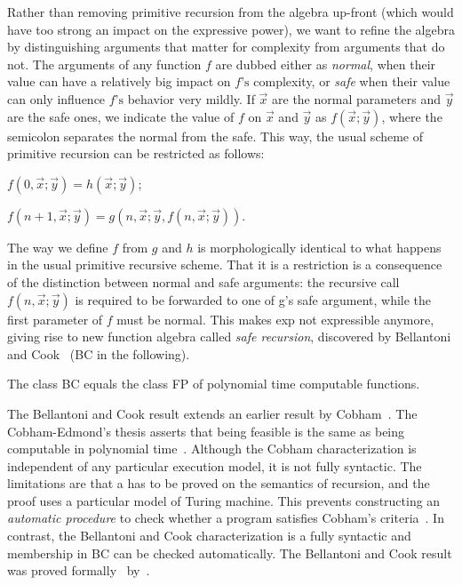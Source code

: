 Rather than removing primitive recursion from the algebra up-front (which would have too strong an impact on the expressive power), %
we want to refine the algebra by distinguishing arguments that matter for complexity from arguments that do not.
The arguments of any function \(f\) are dubbed either as \emph{normal}, when their value can have a relatively big impact on \(f\text{'s}\) complexity, or \emph{safe} when their value can only influence \(f\)\(\text{'s}\) behavior very mildly. %
If \(\vec{x}\) are the normal parameters and \(\vec{y}\) are the safe ones,
we indicate the value of \(f\) on \(\vec{x}\) and \(\vec{y}\) as \(f(\vec{x};\vec{y})\),
where the semicolon separates the normal from the safe.
This way, the usual scheme of primitive recursion can be restricted as follows:

\begin{center}
    \(f (0, \vec{x};\vec{y}) = h (\vec{x};\vec{y})\);

    \(f (n + 1,\vec{x};{ }\vec{y}) = g (n, \vec{x}; \vec{y}, f(n,\vec{x}; \vec{y})) \).
\end{center}

\noindent The way we define \(f\) from \(g\) and \(h\) is morphologically identical to what happens in the usual primitive recursive scheme.
That it is a restriction is a consequence of the distinction between normal and safe arguments: the recursive call \(f(n,\vec{x}; \vec{y})\) is required to be forwarded to one of g's safe argument, while the first parameter of \(f\) must be normal.
This makes exp not expressible anymore, giving rise to new function algebra called \emph{safe recursion}, discovered by Bellantoni and Cook~\cite{bellantoni1992} (BC in the following).

\begin{theorem}
The class BC equals the class FP of polynomial time computable functions.
\end{theorem}

The Bellantoni and Cook result extends an earlier result by Cobham~\cite{cobham1965}.
The Cobham-Edmond's thesis asserts that being feasible is the same as being computable in polynomial time~\cite{cobham1965,edmonds1965}.
Although the Cobham characterization is independent of any particular execution model, it is not fully syntactic.
The limitations are that a  has to be proved on the semantics of recursion, and the proof uses a particular model of Turing machine.
This prevents constructing an \emph{automatic procedure} to check whether a program satisfies Cobham's criteria~\cite{heraud2011}.
In contrast, the Bellantoni and Cook characterization is a fully syntactic and membership in BC can be checked automatically.
The Bellantoni and Cook result was proved formally~\cite{bc_formal} by~\textcite{heraud2011}.

